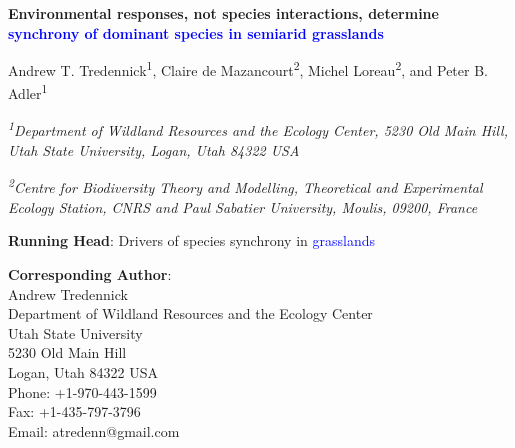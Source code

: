 \documentclass[12pt,]{article}
\title{}
\author{}
\date{}
\begin{document}
\maketitle


\renewcommand\linenumberfont{\normalfont\tiny\sffamily\color{gray}}




\begin{singlespace}

\begin{center}
\large{\textbf{Environmental responses, not species interactions, determine \textcolor{blue}{synchrony of dominant species in semiarid grasslands}}}

\renewcommand*{\thefootnote}{\fnsymbol{footnote}}

\vspace{1em}

\normalsize{Andrew T. Tredennick\textsuperscript{1}, Claire de Mazancourt\textsuperscript{2}, Michel Loreau\textsuperscript{2}, and Peter B. Adler\textsuperscript{1}}

\vspace{1em}

\textit{\small{\textsuperscript{1}Department of Wildland Resources and the Ecology Center, 5230 Old Main Hill, Utah State University, Logan, Utah 84322 USA}}

\textit{\small{\textsuperscript{2}Centre for Biodiversity Theory and Modelling, Theoretical and Experimental Ecology Station, CNRS and Paul Sabatier University, Moulis, 09200, France}}

\end{center}

\vspace{2em}

\textbf{Running Head}: Drivers of species synchrony in \textcolor{blue}{grasslands}

\textbf{Corresponding Author}: \\
\hspace{2em}Andrew Tredennick \\  
\hspace{2em}Department of Wildland Resources and the Ecology Center\\
\hspace{2em}Utah State University \\
\hspace{2em}5230 Old Main Hill \\
\hspace{2em}Logan, Utah 84322 USA \\
\hspace{2em}Phone: +1-970-443-1599 \\
\hspace{2em}Fax: +1-435-797-3796 \\
\hspace{2em}Email: atredenn@gmail.com

\end{singlespace}\renewcommand*{\thefootnote}{\arabic{footnote}}
\end{document}
